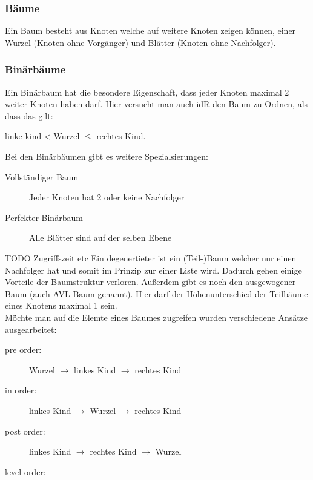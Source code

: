 \documentclass[a4paper]{scrartcl}
\begin{document}
            \subsubsection*{\large{Bäume}}
            Ein Baum besteht aus Knoten welche auf weitere Knoten zeigen können, einer Wurzel (Knoten ohne Vorgänger) und Blätter (Knoten ohne Nachfolger). 
            \subsubsection*{Binärbäume}
                Ein Binärbaum hat die besondere Eigenschaft, dass jeder Knoten maximal 2 weiter Knoten haben darf. Hier versucht man auch idR den Baum zu Ordnen, als dass das  gilt: 
                \begin{center}    
                    linke kind < Wurzel \(\leq\) rechtes Kind.
                \end{center}
                Bei den Binärbäumen gibt es weitere Spezialsierungen:
                
                \begin{description}
                    \item[Vollständiger Baum] Jeder Knoten hat 2 oder keine Nachfolger
                    \item[Perfekter Binärbaum] Alle Blätter sind auf der selben Ebene 
                \end{description}
                TODO Zugriffszeit etc
                Ein degenertieter ist ein (Teil-)Baum welcher nur einen Nachfolger hat und somit im Prinzip zur einer Liste wird. Dadurch gehen einige Vorteile der Baumstruktur verloren.
                Außerdem gibt es noch den ausgewogener Baum (auch AVL-Baum genannt). Hier darf der Höhenunterschied der Teilbäume eines Knotens maximal 1 sein. \\
                Möchte man auf die Elemte eines Baumes zugreifen wurden verschiedene Ansätze ausgearbeitet: 
                \begin{description}
                    \item[pre   order:] Wurzel \(\rightarrow\) linkes Kind \(\rightarrow\) rechtes Kind
                    \item[in    order:] linkes Kind \(\rightarrow\) Wurzel \(\rightarrow\) rechtes Kind
                    \item[post  order:] linkes Kind \(\rightarrow\) rechtes Kind \(\rightarrow\) Wurzel
                    \item[level order:]    
                \end{description} 
\end{document}
